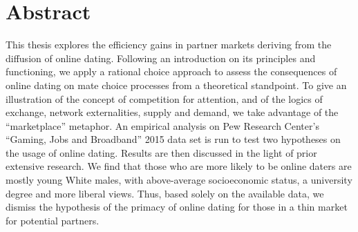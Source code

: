
\chapter*{Abstract}


This thesis explores the efficiency gains in partner markets deriving
from the diffusion of online dating. Following an introduction on
its principles and functioning, we apply a rational choice approach
to assess the consequences of online dating on mate choice processes
from a theoretical standpoint. To give an illustration of the concept
of competition for attention, and of the logics of exchange, network
externalities, supply and demand, we take advantage of the \textquotedblleft marketplace\textquotedblright{}
metaphor. An empirical analysis on Pew Research Center's \textquotedblleft Gaming,
Jobs and Broadband\textquotedblright{} 2015 data set is run to test
two hypotheses on the usage of online dating. Results are then discussed
in the light of prior extensive research. We find that those who are
more likely to be online daters are mostly young White males, with
above-average socioeconomic status, a university degree and more liberal
views. Thus, based solely on the available data, we dismiss the hypothesis
of the primacy of online dating for those in a thin market for potential
partners.
